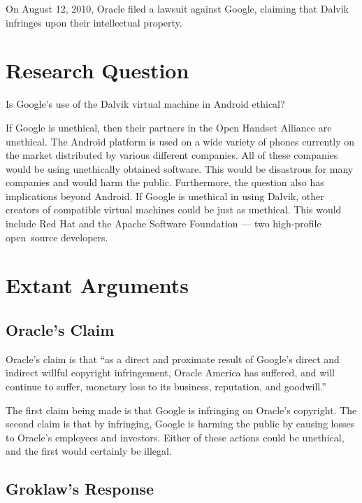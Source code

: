 \documentclass[11pt]{article}
\begin{document}
\begin{multicols}{2}
On August 12, 2010, Oracle filed a lawsuit against Google, claiming that Dalvik
infringes upon their intellectual property. \cite[Count VIII]{oracle-lawsuit}


\section{Research Question} %
\label{sec:question}

Is Google's use of the Dalvik virtual machine in Android ethical?

If Google is unethical, then their partners in the Open Handset Alliance are
unethical.  The Android platform is used on a wide variety of phones currently
on the market distributed by various different companies.  All of these
companies would be using unethically obtained software.  This would be
disastrous for many companies and would harm the public.  Furthermore, the
question also has implications beyond Android.  If Google is unethical in using
Dalvik, other creators of compatible virtual machines could be just as
unethical.  This would include Red Hat and the Apache Software Foundation ---
two high-profile open~source developers.


\section{Extant Arguments} %
\label{sec:args}

\subsection{Oracle's Claim} %
\label{sub:args_oracle}

Oracle's claim is that ``as a direct and proximate result of Google's direct
and indirect willful copyright infringement, Oracle America has suffered, and
will continue to suffer, monetary loss to its business, reputation, and
goodwill.'' \cite[p.~9 line 11]{oracle-lawsuit}

The first claim being made is that Google is infringing on Oracle's copyright.
The second claim is that by infringing, Google is harming the public by causing
losses to Oracle's employees and investors.  Either of these actions could be
unethical, and the first would certainly be illegal.


\subsection{Groklaw's Response} %
\label{sub:args_groklaw}


\end{multicols}
\end{document}
